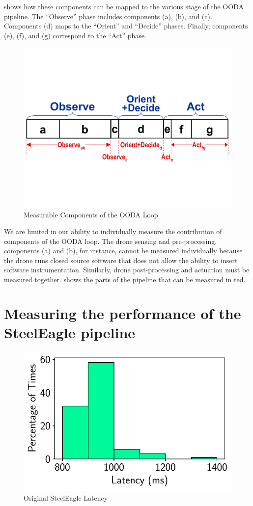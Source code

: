  shows how these components can be mapped to the various
stage of the OODA pipeline. The ``Observe'' phase includes components (a), (b),
and (c). Components (d) maps to the ``Orient'' and ``Decide'' phases. Finally,
components (e), (f), and (g) correspond to the ``Act'' phase.

\begin{figure}[htbp]
\centerline{\includegraphics[width = .5\textwidth]{figs/fig-ooda-nomenclature.pdf}}
\caption{Measurable Components of the OODA Loop}
\label{fig:ooda-nomenclature}
\end{figure}

We are limited in our ability to individually measure the contribution of
components of the OODA loop. The drone sensing and pre-processing, components
(a) and (b), for instance, cannot be measured individually because the drone
runs closed source software that does not allow the ability to insert software
instrumentation. Similarly, drone post-processing and actuation must be
measured together.   shows the parts of the
pipeline that can be measured in red.

\section{Measuring the performance of the SteelEagle pipeline}
\label{sec:steeleagle-performance-measurement}

\begin{figure}[htbp]
\centerline{\includegraphics[width = .4\textwidth]{figs/bala_latency.pdf}}
\caption{Original SteelEagle Latency \cite{bala2024}}
\label{fig:steeleagle-original-latency}
\end{figure}

